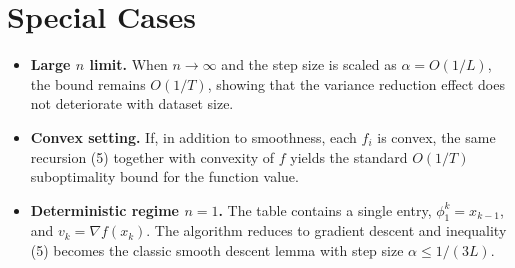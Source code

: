 \documentclass{article}
\begin{document}
\section*{Special Cases}
\begin{itemize}
    \item \textbf{Large $n$ limit.} When $n\to\infty$ and the step size is scaled as $\alpha=O(1/L)$, the bound remains $O(1/T)$, showing that the variance reduction effect does not deteriorate with dataset size.
    \item \textbf{Convex setting.} If, in addition to smoothness, each $f_i$ is convex, the same recursion (5) together with convexity of $f$ yields the standard $O(1/T)$ suboptimality bound for the function value.
    \item \textbf{Deterministic regime $n=1$.} The table contains a single entry, $\phi_1^{k}=x_{k-1}$, and $v_k=\nabla f(x_k)$. The algorithm reduces to gradient descent and inequality (5) becomes the classic smooth descent lemma with step size $\alpha\le1/(3L)$.
\end{itemize}
\end{document}
